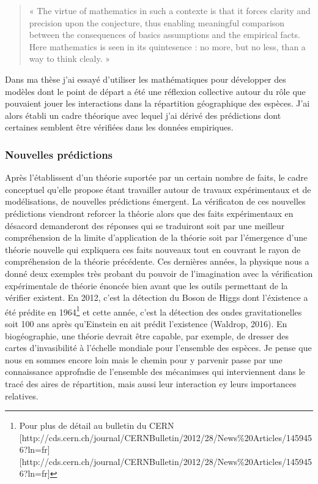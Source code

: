 \begin{quote}
« The virtue of mathematics in such a contexte is that it forces clarity
and precision upon the conjecture, thus enabling meaningful comparison
between the consequences of basics assumptions and the empirical facts.
Here mathematics is seen in its quintesence : no more, but no less, than
a way to think clealy. »
\end{quote}

Dans ma thèse j'ai essayé d'utiliser les mathématiques pour développer
des modèles dont le point de départ a été une réflexion collective
autour du rôle que pouvaient jouer les interactions dans la répartition
géographique des espèces. J'ai alors établi un cadre théorique avec
lequel j'ai dérivé des prédictions dont certaines semblent être
vérifiées dans les données empiriques.

\subsubsection*{Nouvelles prédictions}\label{nouvelles-pruxe9dictions}

Après l'établissent d'un théorie suportée par un certain nombre de
faits, le cadre conceptuel qu'elle propose étant travailler autour de
travaux expérimentaux et de modélisations, de nouvelles prédictions
émergent. La vérificaton de ces nouvelles prédictions viendront reforcer
la théorie alors que des faits expérimentaux en désacord demanderont des
réponses qui se traduiront soit par une meilleur compréhension de la
limite d'application de la théorie soit par l'émergence d'une théorie
nouvelle qui expliquera ces faits nouveaux tout en couvrant le rayon de
compréhension de la théorie précédente. Ces dernières années, la
physique nous a donné deux exemples très probant du pouvoir de
l'imagination avec la vérification expérimentale de théorie énoncée bien
avant que les outils permettant de la vérifier existent. En 2012, c'est
la détection du Boson de Higgs dont l'éxistence a été prédite en
1964\footnote{Pour plus de détail au bulletin du CERN
  {[}http://cds.cern.ch/journal/CERNBulletin/2012/28/News\%20Articles/1459456?ln=fr{]}{[}http://cds.cern.ch/journal/CERNBulletin/2012/28/News\%20Articles/1459456?ln=fr{]}}
et cette année, c'est la détection des ondes gravitationelles soit 100
ans après qu'Einstein en ait prédit l'existence (Waldrop, 2016). En
biogéographie, une théorie devrait être capable, par exemple, de dresser
des cartes d'invasibilité à l'échelle mondiale pour l'ensemble des
espèces. Je pense que nous en sommes encore loin mais le chemin pour y
parvenir passe par une connaissance approfndie de l'ensemble des
mécanimses qui interviennent dans le tracé des aires de répartition,
mais aussi leur interaction ey leurs importances relatives.

